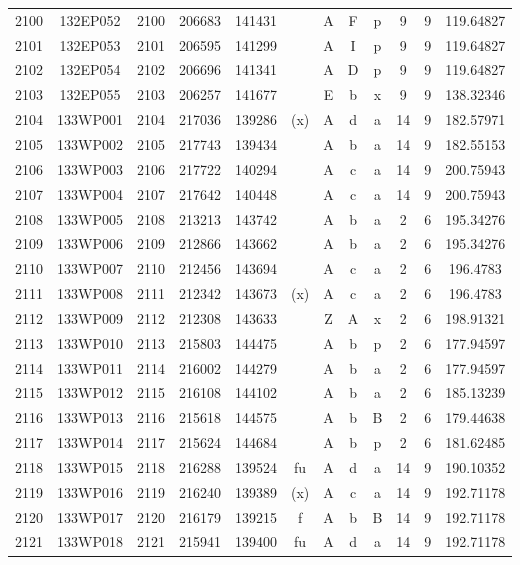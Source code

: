 \begin{tabular}{|*{12}{c|}}
2100 & 132EP052 & 2100 & 206683 & 141431 &  & A & F & p & 9 & 9 & 119.64827 \\ 
2101 & 132EP053 & 2101 & 206595 & 141299 &  & A & I & p & 9 & 9 & 119.64827 \\ 
2102 & 132EP054 & 2102 & 206696 & 141341 &  & A & D & p & 9 & 9 & 119.64827 \\ 
2103 & 132EP055 & 2103 & 206257 & 141677 &  & E & b & x & 9 & 9 & 138.32346 \\ 
2104 & 133WP001 & 2104 & 217036 & 139286 & (x) & A & d & a & 14 & 9 & 182.57971 \\ 
2105 & 133WP002 & 2105 & 217743 & 139434 &  & A & b & a & 14 & 9 & 182.55153 \\ 
2106 & 133WP003 & 2106 & 217722 & 140294 &  & A & c & a & 14 & 9 & 200.75943 \\ 
2107 & 133WP004 & 2107 & 217642 & 140448 &  & A & c & a & 14 & 9 & 200.75943 \\ 
2108 & 133WP005 & 2108 & 213213 & 143742 &  & A & b & a & 2 & 6 & 195.34276 \\ 
2109 & 133WP006 & 2109 & 212866 & 143662 &  & A & b & a & 2 & 6 & 195.34276 \\ 
2110 & 133WP007 & 2110 & 212456 & 143694 &  & A & c & a & 2 & 6 & 196.4783 \\ 
2111 & 133WP008 & 2111 & 212342 & 143673 & (x) & A & c & a & 2 & 6 & 196.4783 \\ 
2112 & 133WP009 & 2112 & 212308 & 143633 &  & Z & A & x & 2 & 6 & 198.91321 \\ 
2113 & 133WP010 & 2113 & 215803 & 144475 &  & A & b & p & 2 & 6 & 177.94597 \\ 
2114 & 133WP011 & 2114 & 216002 & 144279 &  & A & b & a & 2 & 6 & 177.94597 \\ 
2115 & 133WP012 & 2115 & 216108 & 144102 &  & A & b & a & 2 & 6 & 185.13239 \\ 
2116 & 133WP013 & 2116 & 215618 & 144575 &  & A & b & B & 2 & 6 & 179.44638 \\ 
2117 & 133WP014 & 2117 & 215624 & 144684 &  & A & b & p & 2 & 6 & 181.62485 \\ 
2118 & 133WP015 & 2118 & 216288 & 139524 & fu & A & d & a & 14 & 9 & 190.10352 \\ 
2119 & 133WP016 & 2119 & 216240 & 139389 & (x) & A & c & a & 14 & 9 & 192.71178 \\ 
2120 & 133WP017 & 2120 & 216179 & 139215 & f & A & b & B & 14 & 9 & 192.71178 \\ 
2121 & 133WP018 & 2121 & 215941 & 139400 & fu & A & d & a & 14 & 9 & 192.71178 \\ 

\end{tabular}
